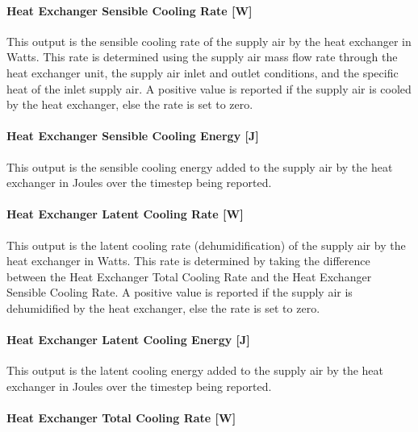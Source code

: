 \paragraph{Heat Exchanger Sensible Cooling Rate {[}W{]}}\label{heat-exchanger-sensible-cooling-rate-w}

This output is the sensible cooling rate of the supply air by the heat exchanger in Watts. This rate is determined using the supply air mass flow rate through the heat exchanger unit, the supply air inlet and outlet conditions, and the specific heat of the inlet supply air. A positive value is reported if the supply air is cooled by the heat exchanger, else the rate is set to zero.

\paragraph{Heat Exchanger Sensible Cooling Energy {[}J{]}}\label{heat-exchanger-sensible-cooling-energy-j}

This output is the sensible cooling energy added to the supply air by the heat exchanger in Joules over the timestep being reported.

\paragraph{Heat Exchanger Latent Cooling Rate {[}W{]}}\label{heat-exchanger-latent-cooling-rate-w}

This output is the latent cooling rate (dehumidification) of the supply air by the heat exchanger in Watts. This rate is determined by taking the difference between the Heat Exchanger Total Cooling Rate and the Heat Exchanger Sensible Cooling Rate. A positive value is reported if the supply air is dehumidified by the heat exchanger, else the rate is set to zero.

\paragraph{Heat Exchanger Latent Cooling Energy {[}J{]}}\label{heat-exchanger-latent-cooling-energy-j}

This output is the latent cooling energy added to the supply air by the heat exchanger in Joules over the timestep being reported.

\paragraph{Heat Exchanger Total Cooling Rate {[}W{]}}\label{heat-exchanger-total-cooling-rate-w}

